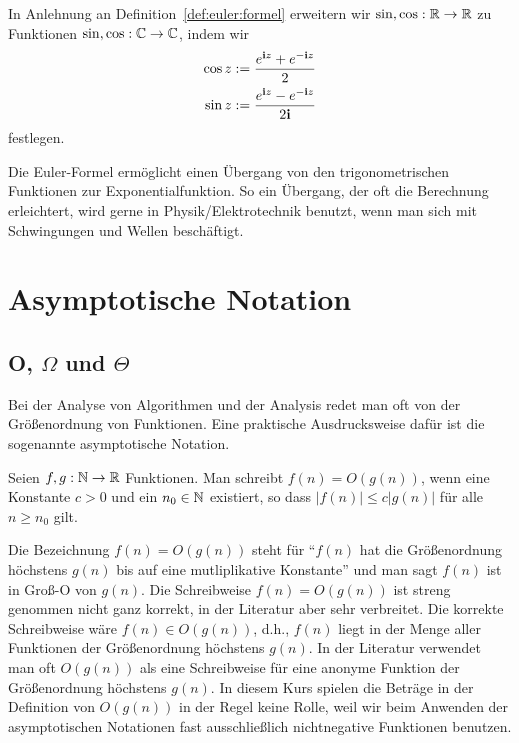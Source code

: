 \begin{defn} 
	In Anlehnung an Definition~\ref{def:euler:formel} erweitern wir $\sin, \cos : \mathbb{R} \to \mathbb{R}$ zu Funktionen $\sin, \cos : \mathbb{C} \to \mathbb{C}$, indem wir 
	\begin{align*}
			\cos z  & : = \frac{e^{\mathbf{i} z} + e^{-\mathbf{i} z}}{2}
			\\ \sin z & := \frac{e^{\mathbf{i} z } - e^{ -\mathbf{i} z}}{2 \mathbf{i}}
	\end{align*} 
	festlegen. 
\end{defn} 

\begin{bem}
	Die Euler-Formel ermöglicht einen Übergang von den trigonometrischen Funktionen zur Exponentialfunktion. So ein Übergang, der oft die Berechnung  erleichtert, wird gerne in Physik/Elektrotechnik benutzt, wenn man sich mit Schwingungen und Wellen beschäftigt. 
\end{bem} 


\section{Asymptotische Notation}

\subsection{O, $\Omega$ und $\Theta$}

\begin{bem}
Bei der Analyse von Algorithmen und der Analysis redet man oft von der Größenordnung von Funktionen. Eine praktische Ausdrucksweise dafür ist die sogenannte asymptotische Notation.
\end{bem} 

\begin{defn}[$O$-Notation]  
Seien $f, g: \mathbb{N} \to \mathbb{R}$ Funktionen. 
Man schreibt $f(n) = O(g(n))$, wenn eine Konstante $c>0$ und ein $n_0 \in \mathbb{N}$ existiert, so dass $|f(n)| \le c |g(n)|$ für alle $n \ge n_0$ gilt. 
\end{defn} 

\begin{bem} 
Die Bezeichnung $f(n)=O(g(n))$ steht für ``$f(n)$ hat die Größenordnung höchstens $g(n)$ bis auf eine mutliplikative Konstante'' und man sagt \glqq$f(n)$ ist in Groß-O von $g(n)$\grqq. Die Schreibweise $f(n) = O(g(n))$ ist streng genommen nicht ganz korrekt, in der Literatur aber sehr verbreitet. Die korrekte Schreibweise wäre $f(n) \in O(g(n))$, d.h., $f(n)$ liegt in der Menge aller Funktionen der Größenordnung höchstens $g(n)$. In der Literatur verwendet man oft $O(g(n))$ als eine Schreibweise für eine anonyme Funktion der Größenordnung höchstens $g(n)$. In diesem Kurs spielen die Beträge in der Definition von $O(g(n))$ in der Regel keine Rolle, weil wir beim Anwenden der asymptotischen Notationen fast ausschließlich nichtnegative Funktionen benutzen. 
\end{bem} 

